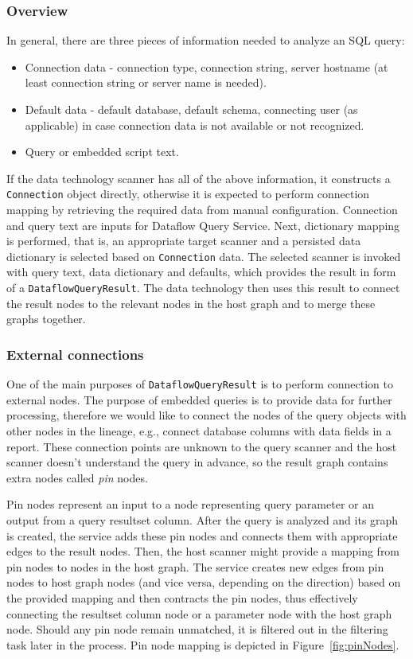 \subsubsection{Overview}
In general, there are three pieces of information needed to analyze an SQL query:
\begin{itemize}
    \item Connection data - connection type, connection string, server hostname (at least connection string or server name is needed).
    \item Default data - default database, default schema, connecting user (as applicable) in case connection data is not available or not recognized.
    \item Query or embedded script text.
\end{itemize}
If the data technology scanner has all of the above information, it constructs a \texttt{Connection} object directly, otherwise it is expected to perform connection mapping by retrieving the required data from manual configuration. Connection and query text are inputs for Dataflow Query Service. Next, dictionary mapping is performed, that is, an appropriate target scanner and a persisted data dictionary is selected based on \texttt{Connection} data. The selected scanner is invoked with query text, data dictionary and defaults, which provides the result in form of a \texttt{DataflowQueryResult}. The data technology then uses this result to connect the result nodes to the relevant nodes in the host graph and to merge these graphs together.

\subsubsection{External connections}
One of the main purposes of \texttt{DataflowQueryResult} is to perform connection to external nodes. The purpose of embedded queries is to provide data for further processing, therefore we would like to connect the nodes of the query objects with other nodes in the lineage, e.g., connect database columns with data fields in a report. These connection points are unknown to the query scanner and the host scanner doesn't understand the query in advance, so the result graph contains extra nodes called \textit{pin} nodes.
\par
Pin nodes represent an input to a node representing query parameter or an output from a query resultset column. After the query is analyzed and its graph is created, the service adds these pin nodes and connects them with appropriate edges to the result nodes. Then, the host scanner might provide a mapping from pin nodes to nodes in the host graph. The service creates new edges from pin nodes to host graph nodes (and vice versa, depending on the direction) based on the provided mapping and then contracts the pin nodes, thus effectively connecting the resultset column node or a parameter node with the host graph node. Should any pin node remain unmatched, it is filtered out in the filtering task later in the process. Pin node mapping is depicted in Figure~\ref{fig:pinNodes}.

